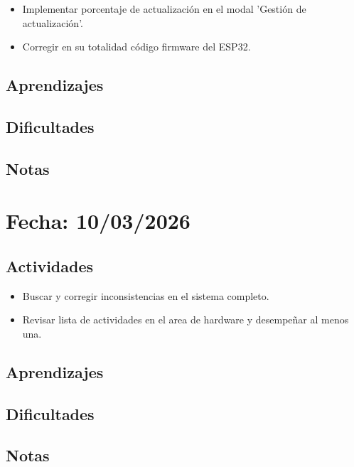 \documentclass[12pt, a4paper]{article}
\begin{document}
    \begin{itemize}
        \item Implementar porcentaje de actualización en el modal 'Gestión de actualización'.
        \item Corregir en su totalidad código firmware del ESP32.
    \end{itemize}

    \subsection*{Aprendizajes}

    \subsection*{Dificultades}

    \subsection*{Notas}

    \section*{Fecha: 10/03/2026}

    \subsection*{Actividades}

    \begin{itemize}
        \item Buscar y corregir inconsistencias en el sistema completo.
        \item Revisar lista de actividades en el area de hardware y desempeñar al menos una.
    \end{itemize}

    \subsection*{Aprendizajes}

    \subsection*{Dificultades}

    \subsection*{Notas}
\end{document}
